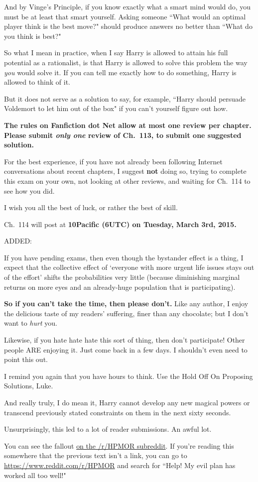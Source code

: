{And by Vinge's Principle, if you know exactly what a smart mind would do, you must be at least that smart yourself. Asking someone ``What would an optimal player think is the best move?" should produce answers no better than ``What do you think is best?"

So what I mean in practice, when I say Harry is allowed to attain his full potential as a rationalist, is that Harry is allowed to solve this problem the way \emph{you} would solve it. If you can tell me exactly how to do something, Harry is allowed to think of it.

But it does not serve as a solution to say, for example, ``Harry should persuade Voldemort to let him out of the box" if you can't yourself figure out how.

\textbf{The rules on Fanfiction dot Net allow at most one review per chapter. Please submit \emph{only one} review of Ch.~113, to submit one suggested solution.}

For the best experience, if you have not already been following Internet conversations about recent chapters, I suggest \textbf{not} doing so, trying to complete this exam on your own, not looking at other reviews, and waiting for Ch.~114 to see how you did.

I wish you all the best of luck, or rather the best of skill.

Ch.~114 will post at \textbf{10\am Pacific (6\pm UTC) on Tuesday, March 3rd, 2015.}

ADDED:

If you have pending exams, then even though the bystander effect is a thing, I expect that the collective effect of `everyone with more urgent life issues stays out of the effort' shifts the probabilities very little (because diminishing marginal returns on more eyes and an already-huge population that is participating).

\textbf{So if you can't take the time, then please don't.} Like any author, I enjoy the delicious taste of my readers' suffering, finer than any chocolate; but I don't want to \emph{hurt} you.

Likewise, if you hate hate hate this sort of thing, then don't participate! Other people ARE enjoying it. Just come back in a few days. I shouldn't even need to point this out.

I remind you again that you have hours to think. Use the Hold Off On Proposing Solutions, Luke.

And really truly, I do mean it, Harry cannot develop any new magical powers or transcend previously stated constraints on them in the next sixty seconds.

\later

Unsurprisingly, this led to a lot of reader submissions. An awful lot.

You can see the fallout \href{https://www.reddit.com/r/HPMOR/comments/2xnyi0/113_help_my_evil_plan_has_worked_all_too_well/}{on the /r/HPMOR subreddit}. If you're reading this somewhere that the previous text isn't a link, you can go to \url{https://www.reddit.com/r/HPMOR} and search for ``Help! My evil plan has worked all too well!"

}
